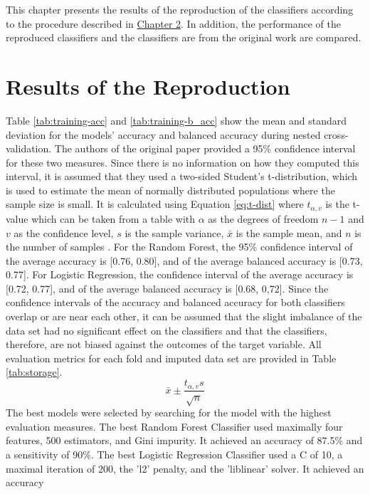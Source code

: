 This chapter presents the results of the reproduction of the classifiers 
according to the procedure described in \hyperref[chap:methods]{Chapter 2}. In 
addition, the performance of the reproduced classifiers and the classifiers are 
from the original work \cite{RN127} are compared. 
\section{Results of the Reproduction}
Table \ref{tab:training-acc} and \ref{tab:training-b_acc} show the mean and 
standard deviation for the models' accuracy and balanced accuracy during 
nested cross-validation. The authors of the original paper provided a 95\% 
confidence interval for these two measures. Since there is no information on 
how they computed this interval, it is assumed that they used a two-sided 
Student's t-distribution, which is used to estimate the mean of normally 
distributed populations where the sample size is small. It is calculated using 
Equation \ref{eq:t-dist} where 
$t_{\alpha, v}$ is the t-value which can be taken from a table with $\alpha$ 
as the degrees of freedom $n-1$ and $v$ as the confidence level, $s$ is the 
sample variance, $\bar{x}$ is the sample mean, and $n$ is the number of samples 
\cite{RN197}.
For the Random Forest, the 95\% confidence interval of the average accuracy is 
[0.76, 0.80], and of the average balanced accuracy is [0.73, 0.77]. 
For Logistic Regression, the confidence interval of the average accuracy is 
[0.72, 0.77], and of the average balanced accuracy is [0.68, 0,72]. Since the 
confidence intervals of the accuracy and balanced accuracy for both classifiers 
overlap or are near each other, it can be assumed that the slight imbalance of 
the data set had no significant effect on the classifiers and that the 
classifiers, therefore, are not biased against the outcomes of the target 
variable. All evaluation metrics for each fold and imputed data set are 
provided in Table \ref{tab:storage}.
\begin{equation}
 \bar{x} \pm \frac{t_{\alpha, v}s}{\sqrt{n}}
 \label{eq:t-dist}
\end{equation}
The best models were selected by searching for the model with the highest 
evaluation measures. The best Random Forest Classifier used 
maximally 
four features, 500 estimators, and Gini impurity. It achieved an accuracy of 
87.5\% and a 
sensitivity of 90\%. The best Logistic Regression Classifier used a C of 10, a 
maximal iteration of 200, the 'l2' penalty, and the 'liblinear' solver. It 
achieved an accuracy 
